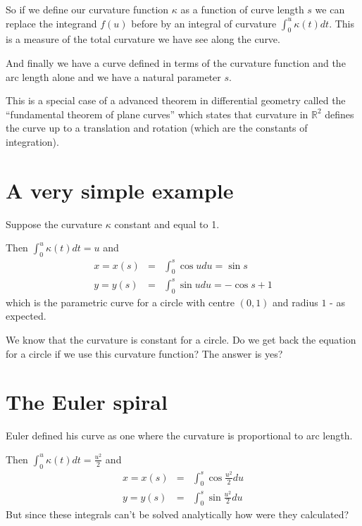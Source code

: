 \documentclass[12pt]{article} %
\theoremstyle{definition}
\theoremstyle{theorem}
\begin{document}
So if we define our curvature function $\kappa$ as a function of curve length $s$ we can replace the integrand $f(u)$ before by an integral of curvature $\int_{0}^{u} \kappa(t) dt$. This is a measure of the total curvature we have see along the curve.

And finally we have a curve defined in terms of the curvature function and the arc length alone and we have a natural parameter $s$.

This is a special case of a advanced theorem in differential geometry called the ``fundamental theorem of plane curves'' which states that curvature in $\mathbb{R}^2$ defines the curve up to a translation and rotation (which are the constants of integration).


\section{A very simple example}
\begin{tcolorbox}
	Suppose the curvature $\kappa$ constant and equal to 1. 
	
	Then 
	$ \int_0^u \kappa(t) dt = u $ and
	\begin{eqnarray*}
		x = x(s) &=& \int_{0}^{s} \cos u du = \sin s\\
		y = y(s) &=& \int_{0}^{s} \sin u du = - \cos s + 1
	\end{eqnarray*}
	which is the parametric curve for a circle with centre $(0, 1)$ and radius $1$ - as expected.
\end{tcolorbox}

We know that the curvature is constant for a circle. Do we get back the equation for a circle if we use this curvature function? The answer is yes?


\section{The Euler spiral}
\begin{tcolorbox}
	Euler defined his curve as one where the curvature is proportional to arc length.
	
	\begin{center}
	\end{center}
	Then 
	$ \int_0^u \kappa(t) dt = \frac{u^2}{2} $ and
	\begin{eqnarray*}
		x = x(s) &=& \int_{0}^{s} \cos \frac{u^2}{2} du\\
		y = y(s) &=& \int_{0}^{s} \sin \frac{u^2}{2} du
	\end{eqnarray*}
	But since these integrals can't be solved analytically how were they calculated?
\end{tcolorbox}
\end{document}
